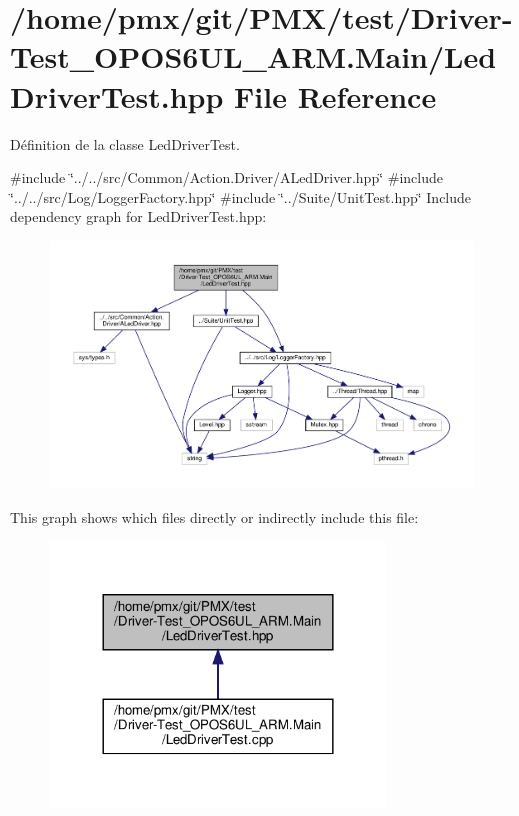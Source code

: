 \hypertarget{Driver-Test__OPOS6UL__ARM_8Main_2LedDriverTest_8hpp}{}\section{/home/pmx/git/\+P\+M\+X/test/\+Driver-\/\+Test\+\_\+\+O\+P\+O\+S6\+U\+L\+\_\+\+A\+RM.Main/\+Led\+Driver\+Test.hpp File Reference}
\label{Driver-Test__OPOS6UL__ARM_8Main_2LedDriverTest_8hpp}


Définition de la classe Led\+Driver\+Test.  


{\ttfamily \#include \char`\"{}../../src/\+Common/\+Action.\+Driver/\+A\+Led\+Driver.\+hpp\char`\"{}}\newline
{\ttfamily \#include \char`\"{}../../src/\+Log/\+Logger\+Factory.\+hpp\char`\"{}}\newline
{\ttfamily \#include \char`\"{}../\+Suite/\+Unit\+Test.\+hpp\char`\"{}}\newline
Include dependency graph for Led\+Driver\+Test.\+hpp\+:
\nopagebreak
\begin{figure}[H]
\begin{center}
\leavevmode
\includegraphics[width=350pt]{Driver-Test__OPOS6UL__ARM_8Main_2LedDriverTest_8hpp__incl}
\end{center}
\end{figure}
This graph shows which files directly or indirectly include this file\+:
\nopagebreak
\begin{figure}[H]
\begin{center}
\leavevmode
\includegraphics[width=252pt]{Driver-Test__OPOS6UL__ARM_8Main_2LedDriverTest_8hpp__dep__incl}
\end{center}
\end{figure}
